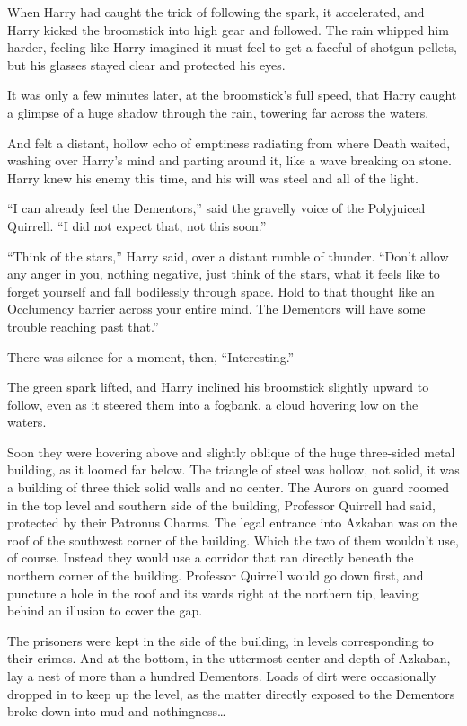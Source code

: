 When Harry had caught the trick of following the spark, it accelerated,
and Harry kicked the broomstick into high gear and followed. The rain
whipped him harder, feeling like Harry imagined it must feel to get a
faceful of shotgun pellets, but his glasses stayed clear and protected
his eyes.

It was only a few minutes later, at the broomstick's full speed, that
Harry caught a glimpse of a huge shadow through the rain, towering far
across the waters.

And felt a distant, hollow echo of emptiness radiating from where Death
waited, washing over Harry's mind and parting around it, like a wave
breaking on stone. Harry knew his enemy this time, and his will was
steel and all of the light.

``I can already feel the Dementors,'' said the gravelly voice of the
Polyjuiced Quirrell. ``I did not expect that, not this soon.''

``Think of the stars,'' Harry said, over a distant rumble of thunder.
``Don't allow any anger in you, nothing negative, just think of the
stars, what it feels like to forget yourself and fall bodilessly through
space. Hold to that thought like an Occlumency barrier across your
entire mind. The Dementors will have some trouble reaching past that.''

There was silence for a moment, then, ``Interesting.''

The green spark lifted, and Harry inclined his broomstick slightly
upward to follow, even as it steered them into a fogbank, a cloud
hovering low on the waters.

Soon they were hovering above and slightly oblique of the huge
three-sided metal building, as it loomed far below. The triangle of
steel was hollow, not solid, it was a building of three thick solid
walls and no center. The Aurors on guard roomed in the top level and
southern side of the building, Professor Quirrell had said, protected by
their Patronus Charms. The legal entrance into Azkaban was on the roof
of the southwest corner of the building. Which the two of them wouldn't
use, of course. Instead they would use a corridor that ran directly
beneath the northern corner of the building. Professor Quirrell would go
down first, and puncture a hole in the roof and its wards right at the
northern tip, leaving behind an illusion to cover the gap.

The prisoners were kept in the side of the building, in levels
corresponding to their crimes. And at the bottom, in the uttermost
center and depth of Azkaban, lay a nest of more than a hundred
Dementors. Loads of dirt were occasionally dropped in to keep up the
level, as the matter directly exposed to the Dementors broke down into
mud and nothingness\ldots{}

